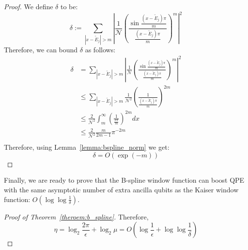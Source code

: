 \begin{proof}
We define $\delta$ to be:
\begin{equation}
     \delta := \sum_{|x - \tilde E_j| > m} \left| \frac{1}{\mathcal{N}}\left(\frac{\sin \frac{(x-\tilde E_j)\pi}{m}}{ \frac{(x-\tilde E_j)\pi}{m}}\right)^m \right|^2
\end{equation}
Therefore, we can bound $\delta$ as follows:
    \begin{align}
        \delta &= \sum_{|x - \tilde E_j| > m} \left|\frac{1}{\mathcal{N}}\left(\frac{\sin \frac{(x-\tilde E_j)\pi}{m}}{ \frac{(x-\tilde E_j)\pi}{m}}\right)^m \right|^2 \\
        &\leq \sum_{|x - \tilde E_j| > m} \frac{1}{\mathcal{N}^2}\left(\frac{1}{ \frac{(x-\tilde E_j)\pi}{m}}\right)^{2m} \\
        &\leq \frac{2}{\mathcal{N}^2}\int_{m}^{\infty} \left(\frac{1}{ \frac{x\pi}{m}}\right)^{2m} dx\\
        & \leq  \frac{2}{\mathcal{N}^2} \frac{m}{2m-1}\pi^{-2m}\\
    \end{align}
    Therefore, using Lemma~\ref{lemma:bspline_norm} we get:
    \begin{equation}
        \delta = O(\exp(-m))
    \end{equation}
\end{proof}
Finally, we are ready to prove that the B-spline window function can boost QPE with the same asymptotic number of extra ancilla qubits as the Kaiser window function: $O\left(\log \log \frac{1}{\delta}\right)$.
\begin{proof}[Proof of Theorem~\ref{theroem:b_spline}]
    Therefore,
\begin{equation}
    \eta = \log_2 \frac{2\pi}{\epsilon} + \log_2 \mu = O\left(\log \frac{1}{\epsilon} + \log \log \frac{1}{\delta}\right)
\end{equation}
\end{proof}

